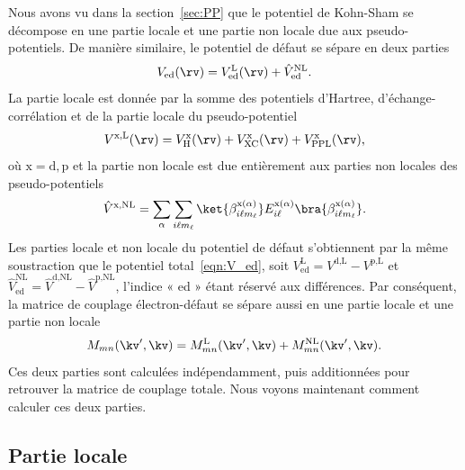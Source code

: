 Nous avons vu dans la section~\ref{sec:PP} que le potentiel de Kohn-Sham se décompose en une partie locale et une partie non locale due aux pseudo-potentiels. De manière similaire, le potentiel de défaut se sépare en deux parties
\begin{equation}
    V_\text{ed}(\rv) = V_\text{ed}^\text{L}(\rv)+\hat{V}_\text{ed}^\text{NL}.
\end{equation}
La partie locale est donnée par la somme des potentiels d'Hartree, d'échange-corrélation et de la partie locale du pseudo-potentiel
\begin{equation}
    V^\text{x,L}(\rv) = V_\text{H}^\text{x}(\rv) + V_\text{XC}^\text{x}(\rv)+V_\text{PPL}^\text{x}(\rv),
\end{equation}
où $\text{x} = \text{d},\text{p}$ et la partie non locale est due entièrement aux parties non locales des pseudo-potentiels
\begin{equation}
    \hat{V}^\text{x,NL} = \sum_{\alpha}\sum_{i\ell m_\ell}\ket{\beta_{i\ell m_\ell}^{\text{x}(\alpha)}}E_{i\ell}^{\text{x}(\alpha)}\bra{\beta_{i\ell m_\ell}^{\text{x}(\alpha)}}.\label{eqn:V_ed_NL}
\end{equation}
Les parties locale et non locale du potentiel de défaut s'obtiennent par la même soustraction que le potentiel total~\eqref{eqn:V_ed}, soit $V_\text{ed}^\text{L} = V^\text{d,L}-V^\text{p,L}$ et $\hat{V}_\text{ed}^\text{NL} = \hat{V}^\text{d,NL}-\hat{V}^\text{p,NL}$, l'indice « ed » étant réservé aux différences. Par conséquent, la matrice de couplage électron-défaut se sépare aussi en une partie locale et une partie non locale
\begin{equation}
    M_{mn}(\kv',\kv) = M_{mn}^\text{L}(\kv',\kv) + M_{mn}^\text{NL}(\kv',\kv).
\end{equation}
Ces deux parties sont calculées indépendamment, puis additionnées pour retrouver la matrice de couplage totale. Nous voyons maintenant comment calculer ces deux parties.

\subsection{Partie locale}\label{sec:M_local}

